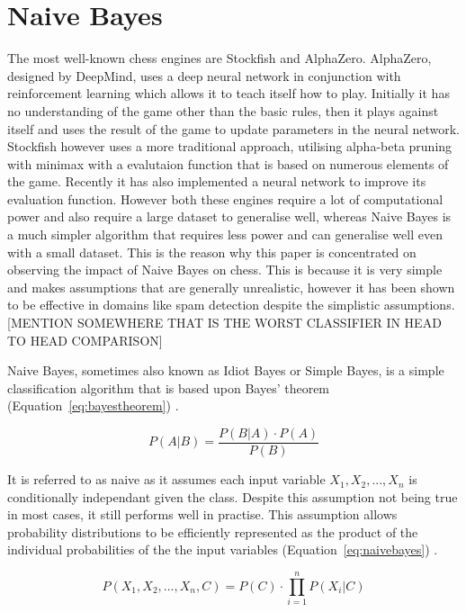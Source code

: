 \section{Naive Bayes}
The most well-known chess engines are Stockfish and AlphaZero. AlphaZero, designed by DeepMind, uses a deep neural network in conjunction with reinforcement learning which allows it to teach itself how to play. Initially it has no understanding of the game other than the basic rules, then it plays against itself and uses the result of the game to update parameters in the neural network. Stockfish however uses a more traditional approach, utilising alpha-beta pruning with minimax with a evalutaion function that is based on numerous elements of the game. Recently it has also implemented a neural network to improve its evaluation function. However both these engines require a lot of computational power and also require a large dataset to generalise well, whereas Naive Bayes is a much simpler algorithm that requires less power and can generalise well even with a small dataset. This is the reason why this paper is concentrated on observing the impact of Naive Bayes on chess. This is because it is very simple and makes assumptions that are generally unrealistic, however it has been shown to be effective in domains like spam detection \cite{eberhardtBayesianSpamDetection2015} despite the simplistic assumptions. [MENTION SOMEWHERE THAT IS THE WORST CLASSIFIER IN HEAD TO HEAD COMPARISON]

Naive Bayes, sometimes also known as Idiot Bayes or Simple Bayes, is a simple classification algorithm that is based upon Bayes' theorem (Equation~\ref{eq:bayestheorem}) \cite{lowdNaiveBayesModels2005}. 

\begin{equation}
    \label{eq:bayestheorem}
    P(A|B) = \frac{P(B|A) \cdot P(A)}{P(B)}
\end{equation}

It is referred to as naive as it assumes each input variable $X_1, X_2,..., X_n $ is conditionally independant given the class. Despite this assumption not being true in most cases, it still performs well in practise. This assumption allows probability distributions to be efficiently represented as the product of the individual probabilities of the the input variables (Equation~\ref{eq:naivebayes}) \cite{lowdNaiveBayesModels2005}.

\begin{equation}
\label{eq:naivebayes}
P(X_1, X_2, ..., X_n, C) ={P(C)}\cdot \prod_{i=1}^{n}{P(X_i | C)}
\end{equation}
